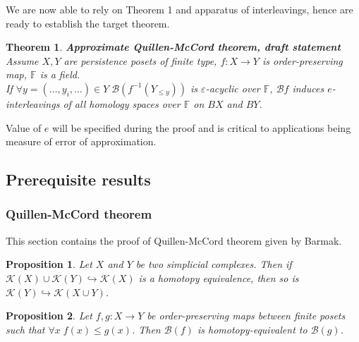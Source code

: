 \documentclass[a4paper, 12pt]{article}
\newtheorem{proposition}{Proposition}
\newtheorem{theorem}{Theorem}
\theoremstyle{definition}
\theoremstyle{remark}
\renewcommand{\leq}{\leqslant}
\begin{document}
We are now able to rely on Theorem 1 and apparatus of interleavings, hence are ready to establish the target theorem.\\

\begin{theorem} \textbf{Approximate Quillen-McCord theorem, draft statement}\\
  Assume $X, Y$ are persistence posets of finite type, $f : X \to Y$ is order-preserving map, $\mathbb{F}$ is a field.\\
  If $\forall y=(\ldots,y_i,\ldots) \in Y\;\mathcal{B}(f^{-1}(Y_{\leqslant y}))$ is $\varepsilon$-acyclic over $\mathbb{F}$, $\mathcal{B}f$ induces $e$-interleavings of all homology spaces over $\mathbb{F}$ on $BX$ and $BY$.\\
\end{theorem}

Value of $e$ will be specified during the proof and is critical to applications being measure of error of approximation.

\subsection{Prerequisite results}

\subsubsection{Quillen-McCord theorem}

This section contains the proof of Quillen-McCord theorem given by Barmak.

\begin{proposition} {\cite[Proposition 2.1]{Bar11}}
  Let $X$ and $Y$ be two simplicial complexes. Then if $\mathcal{K}(X) \cup \mathcal{K}(Y) \hookrightarrow \mathcal{K}(X)$ is a homotopy equivalence, then so is $\mathcal{K}(Y) \hookrightarrow \mathcal{K}(X \cup Y)$.
\end{proposition}

\begin{proposition} {\cite[Proposition 2.2]{Bar11}}
  Let $f,g : X \to Y$ be order-preserving maps between finite posets such that $\forall x\;f(x) \leq g(x)$. Then $\mathcal{B}(f)$ is homotopy-equivalent to $\mathcal{B}(g)$.
\end{proposition}
\end{document}
